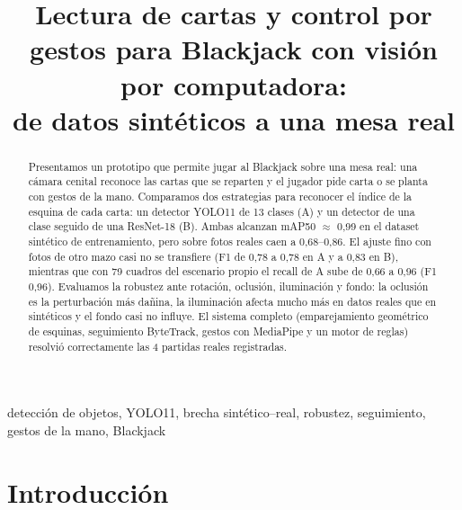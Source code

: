 \documentclass[conference,a4paper]{IEEEtran}
\begin{document}
\title{Lectura de cartas y control por gestos para Blackjack con visión por computadora:\\
de datos sintéticos a una mesa real}

\author{
}

\maketitle

\begin{abstract}
Presentamos un prototipo que permite jugar al Blackjack sobre una mesa real: una cámara cenital reconoce las cartas
que se reparten y el jugador pide carta o se planta con gestos de la mano. Comparamos dos estrategias para reconocer el
índice de la esquina de cada carta: un detector YOLO11 de 13 clases (A) y un detector de una clase seguido de una
ResNet-18 (B). Ambas alcanzan mAP50 $\approx$ 0,99 en el dataset sintético de entrenamiento, pero sobre fotos reales
caen a 0,68--0,86. El ajuste fino con fotos de otro mazo casi no se transfiere (F1 de 0,78 a 0,78
en A y a 0,83 en B), mientras que con 79 cuadros del escenario propio el recall de A sube de 0,66 a 0,96 (F1 0,96). Evaluamos la robustez ante rotación, oclusión,
iluminación y fondo: la oclusión es la perturbación más dañina, la iluminación afecta mucho más en datos reales que en
sintéticos y el fondo casi no influye. El sistema completo (emparejamiento geométrico de esquinas, seguimiento
ByteTrack, gestos con MediaPipe y un motor de reglas) resolvió correctamente las 4 partidas reales registradas.
\end{abstract}

\begin{IEEEkeywords}
detección de objetos, YOLO11, brecha sintético--real, robustez, seguimiento, gestos de la mano, Blackjack
\end{IEEEkeywords}

\section{Introducción}
\end{document}

